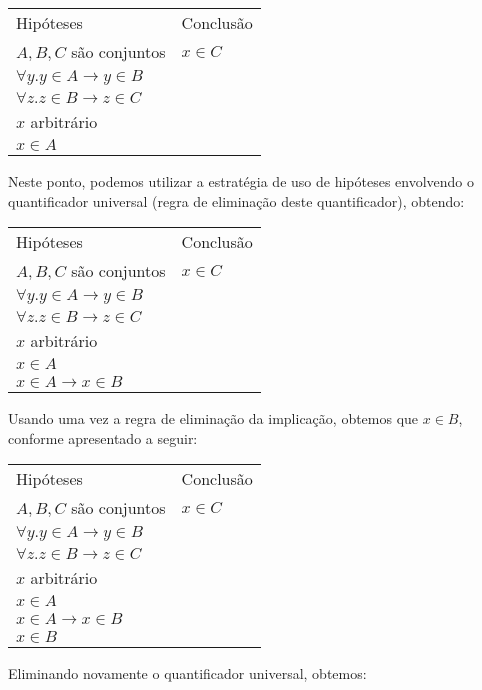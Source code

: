 \begin{Example}
\begin{flushleft}
  \begin{tabular}{ll}
        Hipóteses & Conclusão \\
        $A,B,C$ são conjuntos & $x \in C$\\
        $\forall y. y\in A \to y \in B$ & \\
       $\forall z. z \in B \to z \in C$ & \\
       $x$ arbitrário & \\
       $x\in A$ & \\
  \end{tabular}
\end{flushleft}
Neste ponto, podemos utilizar a estratégia de uso de hipóteses
envolvendo o quantificador universal (regra de eliminação deste
quantificador), obtendo:
\begin{flushleft}
  \begin{tabular}{ll}
        Hipóteses & Conclusão \\
        $A,B,C$ são conjuntos & $x \in C$\\
        $\forall y. y\in A \to y \in B$ & \\
       $\forall z. z \in B \to z \in C$ & \\
       $x$ arbitrário & \\
       $x\in A$ & \\
       $x\in A \to x\in B$ & \\
  \end{tabular}
\end{flushleft}
Usando uma vez a regra de eliminação da implicação, obtemos que $x\in
B$, conforme apresentado a seguir:
\begin{flushleft}
  \begin{tabular}{ll}
        Hipóteses & Conclusão \\
        $A,B,C$ são conjuntos & $x \in C$\\
        $\forall y. y\in A \to y \in B$ & \\
       $\forall z. z \in B \to z \in C$ & \\
       $x$ arbitrário & \\
       $x\in A$ & \\
       $x\in A \to x\in B$ & \\
       $x\in B$ & \\
  \end{tabular}
\end{flushleft}
Eliminando novamente o quantificador universal, obtemos:
\begin{flushleft}
  \begin{tabular}{ll}

\end{tabular}
\end{flushleft}
\end{Example}
